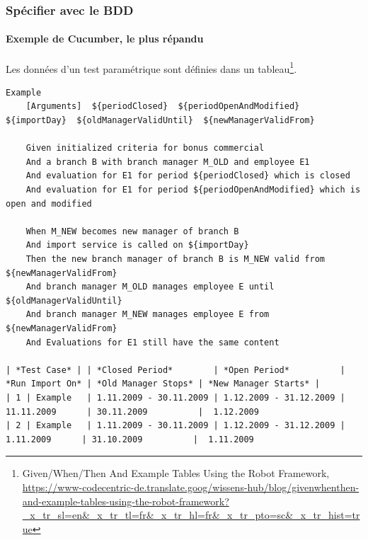 \documentclass{beamer}
\begin{document}
    \begin{frame}[fragile]
        \frametitle{Spécifier avec le BDD}
        \framesubtitle{Exemple de Cucumber, le plus répandu}
        \transdissolve
        Les données d'un test paramétrique sont définies dans un tableau\footnote{Given/When/Then And Example Tables Using the Robot Framework, \url{https://www-codecentric-de.translate.goog/wissens-hub/blog/givenwhenthen-and-example-tables-using-the-robot-framework?_x_tr_sl=en&_x_tr_tl=fr&_x_tr_hl=fr&_x_tr_pto=sc&_x_tr_hist=true}}.
        \begin{lstlisting}[basicstyle=\ttfamily\tiny]
Example
    [Arguments]  ${periodClosed}  ${periodOpenAndModified}  ${importDay}  ${oldManagerValidUntil}  ${newManagerValidFrom}

    Given initialized criteria for bonus commercial
    And a branch B with branch manager M_OLD and employee E1
    And evaluation for E1 for period ${periodClosed} which is closed
    And evaluation for E1 for period ${periodOpenAndModified} which is open and modified

    When M_NEW becomes new manager of branch B
    And import service is called on ${importDay}
    Then the new branch manager of branch B is M_NEW valid from ${newManagerValidFrom}
    And branch manager M_OLD manages employee E until ${oldManagerValidUntil}
    And branch manager M_NEW manages employee E from ${newManagerValidFrom}
    And Evaluations for E1 still have the same content

| *Test Case* | | *Closed Period*        | *Open Period*          | *Run Import On* | *Old Manager Stops* | *New Manager Starts* |
| 1 | Example   | 1.11.2009 - 30.11.2009 | 1.12.2009 - 31.12.2009 | 11.11.2009      | 30.11.2009          |  1.12.2009
| 2 | Example   | 1.11.2009 - 30.11.2009 | 1.12.2009 - 31.12.2009 |  1.11.2009      | 31.10.2009          |  1.11.2009
        \end{lstlisting}
    \end{frame}
\end{document}
